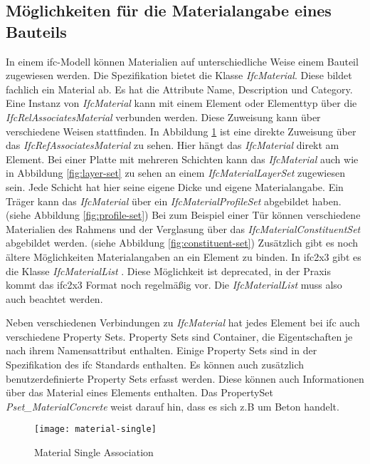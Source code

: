 \subsection{Möglichkeiten für die  Materialangabe eines Bauteils}
\label{c:basics:ifc:buildingmaterial}
In einem \ac{ifc}-Modell können Materialien auf unterschiedliche Weise einem Bauteil zugewiesen werden. Die Spezifikation bietet die Klasse \textit{IfcMaterial}. Diese bildet fachlich ein Material ab. Es hat die Attribute Name, Description und Category.\citep{ifc_material} Eine Instanz von \textit{IfcMaterial} kann mit einem Element oder Elementtyp über die \textit{IfcRelAssociatesMaterial} verbunden werden. Diese Zuweisung kann über verschiedene Weisen stattfinden. In Abbildung \ref{fig:material-single} ist eine direkte Zuweisung über das \textit{IfcRefAssociatesMaterial} zu sehen. Hier hängt das \textit{IfcMaterial} direkt am Element. 
Bei einer Platte mit mehreren Schichten kann das \textit{IfcMaterial} auch wie in Abbildung \ref{fig:layer-set} zu sehen an einem \textit{IfcMaterialLayerSet} zugewiesen sein. Jede Schicht hat hier seine eigene Dicke und eigene Materialangabe. 
Ein Träger kann das \textit{IfcMaterial} über ein \textit{IfcMaterialProfileSet} abgebildet haben. (siehe Abbildung \ref{fig:profile-set})
Bei zum Beispiel einer Tür können verschiedene Materialien des Rahmens und der Verglasung über das \textit{IfcMaterialConstituentSet} abgebildet werden. (siehe Abbildung \ref{fig:constituent-set}) \citep{ifc_material_association}
Zusätzlich gibt es noch ältere Möglichkeiten Materialangaben an ein Element zu binden. In \ac{ifc2x3} gibt es die Klasse \textit{IfcMaterialList} \citep{Thomas2007_MaterialList}. Diese Möglichkeit ist deprecated, in der Praxis kommt das \ac{ifc2x3} Format noch regelmäßig vor. Die \textit{IfcMaterialList} muss also auch beachtet werden.

Neben verschiedenen Verbindungen zu \textit{IfcMaterial} hat jedes Element bei \ac{ifc} auch verschiedene Property Sets. Property Sets sind Container, die Eigentschaften je nach ihrem Namensattribut enthalten. Einige Property Sets sind in der Spezifikation des \ac{ifc} Standards enthalten. Es können auch zusätzlich benutzerdefinierte Property Sets erfasst werden. Diese können auch Informationen über das Material eines Elements enthalten. \citep{ifc_property_set} Das PropertySet \textit{Pset\_MaterialConcrete} weist darauf hin, dass es sich z.B um Beton handelt.

\begin{figure}[h]
	\centering
	\texttt{[image: material-single]}
	\caption[IfcMaterial]{Material Single Association}
	\label{fig:material-single}
\end{figure}

